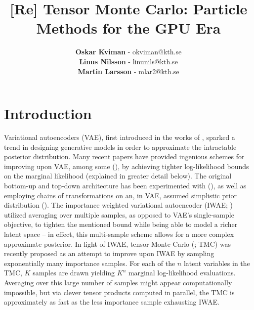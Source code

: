 \documentclass{article}
\title{
	[Re] Tensor Monte Carlo: Particle Methods for the GPU Era
}
\author{
    \textbf{Oskar Kviman} - okviman@kth.se\\
    \textbf{Linus Nilsson} - linunils@kth.se\\
    \textbf{Martin Larsson} - mlar2@kth.se  \\
}
\begin{document}
\maketitle


\section{Introduction}
Variational autoencoders (VAE), first introduced in the works of \cite{kingma2013autoencoding}, sparked a trend in designing generative models in order to approximate the intractable posterior distribution. Many recent papers have provided ingenious schemes for improving upon VAE, among some (\cite{iwae, rezende2015variational, ladder, kingma2018glow}), by achieving tighter log-likelihood bounds on the marginal likelihood (explained in greater detail below). The original bottom-up and top-down architecture has been experimented with (\cite{ladder}), as well as employing chains of transformations on an, in VAE, assumed simplistic prior distribution (\cite{rezende2015variational, kingma2018glow}). The importance weighted variational autoencoder (IWAE; \cite{iwae}) utilized averaging over multiple samples, as opposed to VAE's single-sample objective, to tighten the mentioned bound while being able to model a richer latent space – in effect, this multi-sample scheme allows for a more complex approximate posterior. In light of IWAE, tensor Monte-Carlo (\cite{tmc}; TMC) was recently proposed as an attempt to improve upon IWAE by sampling exponentially many importance samples. For each of the $n$ latent variables in the TMC, $K$ samples are drawn yielding $K^n$ marginal log-likelihood evaluations. Averaging over this large number of samples might appear computationally impossible, but via clever tensor products computed in parallel, the TMC is approximately as fast as the less importance sample exhausting IWAE. 
\end{document}
